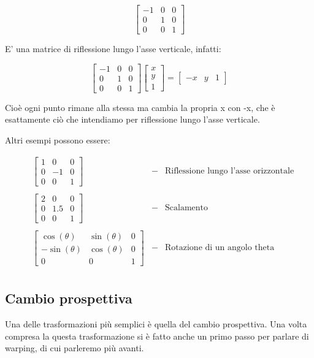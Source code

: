 $$
{\begin{bmatrix}
-1&0&0\\
0&1&0\\
0&0&1
\end{bmatrix}}
$$

\noindent
E' una matrice di riflessione lungo l'asse verticale, infatti: 

$$
{\begin{bmatrix}
-1&0&0\\
0&1&0\\
0&0&1
\end{bmatrix}}
\begin{bmatrix}
x\\y\\1
\end{bmatrix}
=
\begin{bmatrix}
-x&y&1
\end{bmatrix}
$$	

\vspace{1em} \noindent
Cioè ogni punto rimane alla stessa ma cambia la propria x con -x, che è esattamente ciò che intendiamo per riflessione lungo l'asse verticale.

\newpage \noindent 
Altri esempi possono essere:

\begin{align*}
&\begin{bmatrix}
1&0&0\\
0&-1&0\\
0&0&1
\end{bmatrix}&-&
\text{Riflessione lungo l'asse orizzontale}\\
\\
&\begin{bmatrix}
2&0&0\\
0&1.5&0\\
0&0&1
\end{bmatrix}&-&
\text{Scalamento}\\
\\
&\begin{bmatrix}
\cos(\theta )&\sin(\theta )&0\\
-\sin(\theta )&\cos(\theta )&0\\
0&0&1
\end{bmatrix}&-&
\text{Rotazione di un angolo theta}\\
\end{align*}



\subsection{Cambio prospettiva}
Una delle trasformazioni più semplici è quella del cambio prospettiva. Una volta compresa la questa trasformazione si è fatto anche un primo passo per parlare di warping, di cui parleremo più avanti.

